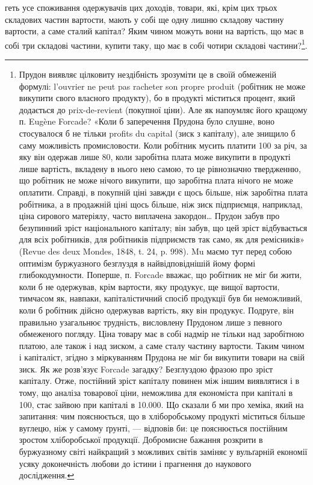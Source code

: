 \parcont{}  %
геть усе споживання одержувачів цих доходів, товари, які, крім цих трьох складових
частин вартости, мають у собі ще одну лишню складову частину вартости,
а саме сталий капітал? Яким чином можуть вони на вартість, що має в
собі три складові частини, купити таку, що має в собі чотири складові частини?\footnote{
Прудон виявляє цілковиту нездібність зрозуміти це в своїй обмеженій формулі: l’ouvrier ne peut
pas racheter son propre produit (робітник не може викупити свого власного продукту), бо в продукті
міститься процент, який додається до prix-de-revient (покупної ціни). Але як напоумляє його кращому
п. Eugène Forcade? «Коли б заперечення Прудона було слушне, воно стосувалося б не тільки profits du
capital (зиск з капіталу), але знищило б саму можливість промисловости. Коли робітник мусить платити
100 за річ, за яку він одержав лише 80, коли заробітна плата може викупити в продукті лише вартість,
вкладену в нього нею самою, то це рівнозначно твердженню, що робітник не може нічого викупити, що
заробітна плата нічого не може оплатити. Справді, в покупній ціні завжди є щось більше, ніж
заробітна плата робітника, а в продажній ціні щось більше, ніж зиск підприємця, наприклад, ціна
сирового матеріялу, часто виплачена закордон\dots{} Прудон забув про безупинний зріст національного
капіталу; він забув, що цей зріст відбувається для всіх робітників, для робітників підприємств так
само, як для ремісників» (Revue des deux Mondes, 1848, t. 24, p. 998). Mu маємо тут перед собою
оптимізм буржуазного безглуздя в найвідповіднішій йому формі глибокодумности. Поперше, п. Forcade
вважає, що робітник не міг би жити, коли б не одержував, крім вартости, яку продукує, ще вищої
вартости, тимчасом як, навпаки, капіталістичний спосіб продукції був би неможливий, коли б робітник
дійсно
одержував вартість, яку він продукує. Подруге, він правильно узагальнює трудність, висловлену
Прудоном лише з певного обмеженого погляду. Ціна товару має в собі надмір не тільки над заробітною
платою, але також і над зиском, а саме сталу частину вартости. Таким чином і капіталіст, згідно з
міркуванням Прудона не міг би викупити товари на свій зиск. Як же розв’язує Forcade загадку?
Безглуздою фразою про зріст капіталу. Отже, постійний зріст капіталу повинен між іншим виявлятися і
в тому, що аналіза товарової ціни, неможлива для економіста при капіталі в 100, стає зайвою при
капіталі в \num{10.000}. Що сказали б ми про хеміка, який на запитання: чим пояснюється, що в
хліборобському продукті міститься більше вуглецю, ніж у самому ґрунті, — відповів би: це пояснюється
постійним зростом хліборобської продукції. Добромисне бажання розкрити в буржуазному світі найкращий
з можливих світів заміняє у вульґарній економії усяку доконечність любови до істини і прагнення до
наукового дослідження.
}.

